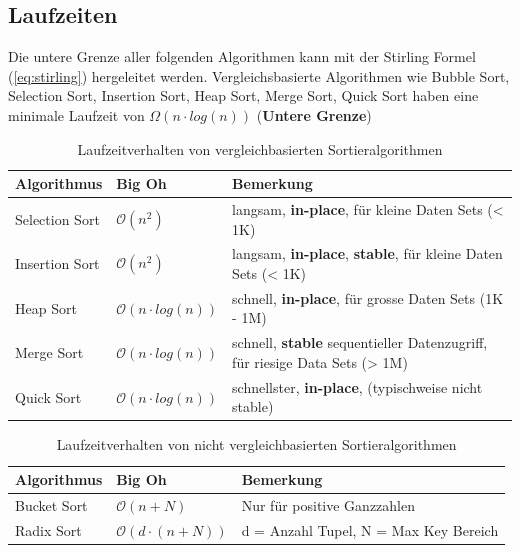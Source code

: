 \subsection{Laufzeiten}
Die untere Grenze aller folgenden Algorithmen kann mit der Stirling Formel (\ref{eq:stirling}) hergeleitet werden. Vergleichsbasierte Algorithmen wie Bubble Sort, Selection Sort, Insertion Sort, Heap Sort, Merge Sort, Quick Sort haben eine minimale Laufzeit von $\Omega(n \cdot log(n))$ (\textbf{Untere Grenze})
\begin{table}[h]
	\centering
	\begin{tabu} to \linewidth {l l X}
		\toprule
		Algorithmus & Big Oh & Bemerkung \\
		\midrule
		Selection Sort & $\mathcal{O}(n^2)$ & langsam, \textbf{in-place}, für kleine Daten Sets (< 1K) \\
		Insertion Sort & $\mathcal{O}(n^2)$ & langsam, \textbf{in-place}, \textbf{stable}, für kleine Daten Sets (< 1K) \\
		Heap Sort & $\mathcal{O}(n \cdot log(n))$ & schnell, \textbf{in-place}, für grosse Daten Sets (1K - 1M) \\
		Merge Sort & $\mathcal{O}(n \cdot log(n))$ & schnell, \textbf{stable} sequentieller Datenzugriff, für riesige Data Sets (> 1M) \\
		Quick Sort & $\mathcal{O}(n \cdot log(n))$ & schnellster, \textbf{in-place}, (typischweise nicht stable)\\
		\bottomrule
	\end{tabu}
	\caption{Laufzeitverhalten von vergleichbasierten Sortieralgorithmen}
\end{table}

\begin{table}[h]
	\centering
	\begin{tabu} to \linewidth {l l X}
		\toprule
		Algorithmus & Big Oh & Bemerkung \\
		\midrule
		Bucket Sort & $\mathcal{O}(n + N)$ & Nur für positive Ganzzahlen \\
		Radix Sort & $\mathcal{O}(d \cdot (n+N))$ &  d = Anzahl Tupel, N = Max Key Bereich \\
		\bottomrule
	\end{tabu}
	\caption{Laufzeitverhalten von nicht vergleichbasierten Sortieralgorithmen}
\end{table}


